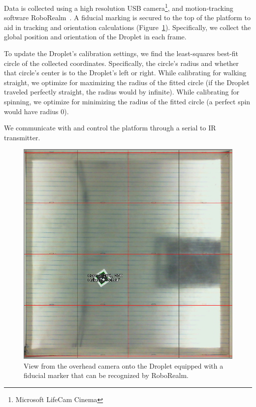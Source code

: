 \documentclass[letterpaper, 10pt, conference]{ieeeconf}
\begin{document}
Data is collected using a high resolution USB camera\footnote{Microsoft LifeCam Cinema}, and motion-tracking software RoboRealm~\cite{RoboRealm}. A fiducial marking is secured to the top of the platform to aid in tracking and orientation calculations (Figure~\ref{fig:expsetup}). Specifically, we collect the global position and orientation of the Droplet in each frame.

To update the Droplet's calibration settings, we find the least-squares best-fit circle of the collected coordinates. Specifically, the circle's radius and whether that circle's center is to the Droplet's left or right. While calibrating for walking straight, we optimize for maximizing the radius of the fitted circle (if the Droplet traveled perfectly straight, the radius would by infinite). While calibrating for spinning, we optimize for minimizing the radius of the fitted circle (a perfect spin would have radius 0).

We communicate with and control the platform through a serial to IR transmitter. 

\begin{figure}[!htb]
\includegraphics[width=\linewidth]{images/cameraView}
\caption{View from the overhead camera onto the Droplet equipped with a fiducial marker that can be recognized by RoboRealm.\label{fig:expsetup}} 
\end{figure}
\end{document}
